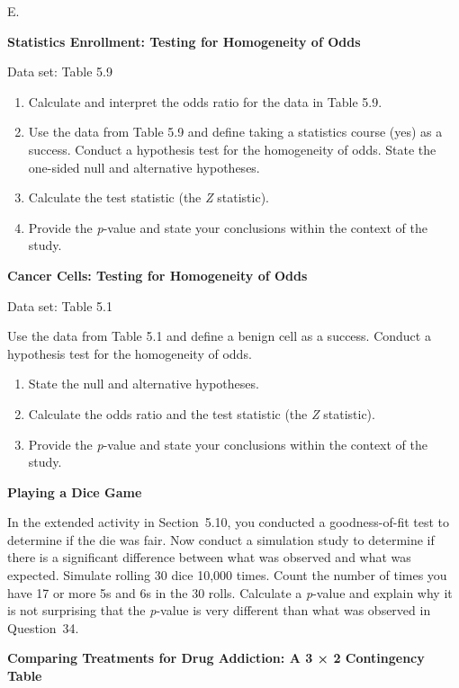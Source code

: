 \documentclass[
]{report}
\newcounter{excount}
\renewcommand{\theexcount}{E\arabic{excount}}
\begin{document}
\begin{list}{\theexcount.}{ \setlength{\itemsep}{0.5em}}
  \item \textbf{Statistics Enrollment: Testing for Homogeneity of Odds}    

  Data set: Table 5.9    
  
  \begin{enumerate}
    \item Calculate and interpret the odds ratio for the data in Table 5.9.
    \item Use the data from Table 5.9 and define taking a statistics course (yes) as a success. Conduct a hypothesis test for the homogeneity of odds. State the one-sided null and alternative hypotheses.
    \item Calculate the test statistic (the \textit{Z} statistic).
    \item Provide the \textit{p}-value and state your conclusions within the context of the study.
  \end{enumerate}

  \item \textbf{Cancer Cells: Testing for Homogeneity of Odds}    

  Data set: Table 5.1    
  
  Use the data from Table 5.1 and define a benign cell as a success. Conduct a hypothesis test for the homogeneity of odds.  
  \begin{enumerate}
    \item State the null and alternative hypotheses.
    \item Calculate the odds ratio and the test statistic (the \textit{Z} statistic).
    \item Provide the \textit{p}-value and state your conclusions within the context of the study.
  \end{enumerate}

  \item \textbf{Playing a Dice Game}    

  In the extended activity in Section 5.10, you conducted a goodness-of-fit test to determine if the die was fair. Now conduct a simulation study to determine if there is a significant difference between what was observed and what was expected. Simulate rolling 30 dice 10,000 times. Count the number of times you have 17 or more 5s and 6s in the 30 rolls. Calculate a \textit{p}-value and explain why it is not surprising that the \textit{p}-value is very different than what was observed in Question 34.

  \item \textbf{Comparing Treatments for Drug Addiction: A 3 × 2 Contingency Table}    


\end{list}
\end{document}
